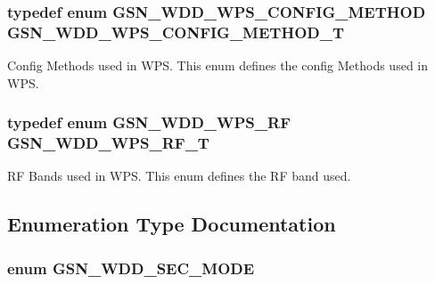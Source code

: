 \hypertarget{a00604_af1a232708dd0046ccf280fe0ce117171}{
\subsubsection[{GSN\_\-WDD\_\-WPS\_\-CONFIG\_\-METHOD\_\-T}]{\setlength{\rightskip}{0pt plus 5cm}typedef enum {\bf GSN\_\-WDD\_\-WPS\_\-CONFIG\_\-METHOD} {\bf GSN\_\-WDD\_\-WPS\_\-CONFIG\_\-METHOD\_\-T}}}
\label{a00604_af1a232708dd0046ccf280fe0ce117171}


Config Methods used in WPS. This enum defines the config Methods used in WPS. 

\hypertarget{a00604_a68fdeea2986eb4735ca5fcd6f45d3d1c}{
\subsubsection[{GSN\_\-WDD\_\-WPS\_\-RF\_\-T}]{\setlength{\rightskip}{0pt plus 5cm}typedef enum {\bf GSN\_\-WDD\_\-WPS\_\-RF} {\bf GSN\_\-WDD\_\-WPS\_\-RF\_\-T}}}
\label{a00604_a68fdeea2986eb4735ca5fcd6f45d3d1c}


RF Bands used in WPS. This enum defines the RF band used. 



\subsection{Enumeration Type Documentation}
\hypertarget{a00604_a1bc8fa529d709c2a8a87aee6038fb7ec}{
\subsubsection[{GSN\_\-WDD\_\-SEC\_\-MODE}]{\setlength{\rightskip}{0pt plus 5cm}enum {\bf GSN\_\-WDD\_\-SEC\_\-MODE}}}
\label{a00604_a1bc8fa529d709c2a8a87aee6038fb7ec}



